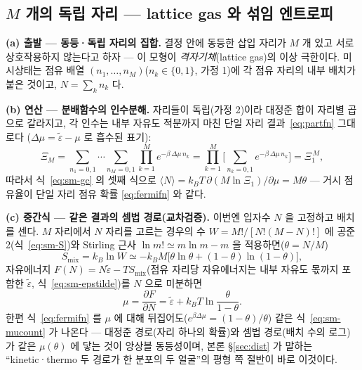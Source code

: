 \subsection{$M$ 개의 독립 자리 --- lattice gas 와 섞임 엔트로피}\label{sec:sm-lattice}
\textbf{(a) 출발 --- 동등·독립 자리의 집합.} 결정 안에 동등한 삽입 자리가 $M$ 개 있고 서로 상호작용하지
않는다고 하자 --- 이 모형이 \emph{격자기체}(lattice gas)의 이상 극한이다. 미시상태는 점유 배열
$(n_1,\dots,n_M)$($n_k\in\{0,1\}$, 가정 1)에 각 점유 자리의 내부 배치가 붙은 것이고, $N=\sum_kn_k$ 다.

\textbf{(b) 연산 --- 분배함수의 인수분해.} 자리들이 독립(가정 2)이라 대정준 합이 자리별 곱으로 갈라지고,
각 인수는 내부 자유도 적분까지 마친 단일 자리 결과~\eqref{eq:partfn} 그대로다
($\Delta\mu=\tilde\varepsilon-\mu$ 로 흡수된 표기):
\begin{equation}
\Xi_M=\sum_{n_1=0,1}\!\cdots\!\sum_{n_M=0,1}\prod_{k=1}^{M}e^{-\beta\,\Delta\mu\,n_k}
=\prod_{k=1}^{M}\Big[\sum_{n_k=0,1}e^{-\beta\,\Delta\mu\,n_k}\Big]=\Xi_1^{\,M},
\label{eq:sm-factor}
\end{equation}
따라서 식~\eqref{eq:sm-gc} 의 셋째 식으로 $\langle N\rangle=k_BT\,\partial(M\ln\Xi_1)/\partial\mu=M\theta$ ---
거시 점유율이 단일 자리 점유 확률 \eqref{eq:fermifn} 와 같다.

\textbf{(c) 중간식 --- 같은 결과의 셈법 경로(교차검증).} 이번엔 입자수 $N$ 을 고정하고 배치를 센다.
$M$ 자리에서 $N$ 자리를 고르는 경우의 수 $W=M!/[N!(M-N)!]$ 에 공준 2(식~\eqref{eq:sm-S})와 Stirling 근사
$\ln m!\simeq m\ln m-m$ 을 적용하면($\theta=N/M$)
\begin{equation}
S_\mathrm{mix}=k_B\ln W\simeq-k_BM\big[\theta\ln\theta+(1-\theta)\ln(1-\theta)\big],
\label{eq:sm-Smix}
\end{equation}
자유에너지 $F(N)=N\tilde\varepsilon-TS_\mathrm{mix}$(점유 자리당 자유에너지는 내부 자유도 몫까지 포함한
$\tilde\varepsilon$, 식~\eqref{eq:sm-epstilde})를 $N$ 으로 미분하면
\begin{equation}
\mu=\frac{\partial F}{\partial N}
=\tilde\varepsilon+k_BT\ln\frac{\theta}{1-\theta}.
\label{eq:sm-mucount}
\end{equation}
한편 식~\eqref{eq:fermifn} 를 $\mu$ 에 대해 뒤집어도($e^{\beta\Delta\mu}=(1-\theta)/\theta$) 같은
식~\eqref{eq:sm-mucount} 가 나온다 --- 대정준 경로(자리 하나의 확률)와 셈법 경로(배치 수의 로그)가 같은
$\mu(\theta)$ 에 닿는 것이 앙상블 동등성이며, 본론 \S\ref{sec:dist} 가 말하는 ``kinetic·thermo 두 경로가 한
분포의 두 얼굴''의 평형 쪽 절반이 바로 이것이다.

